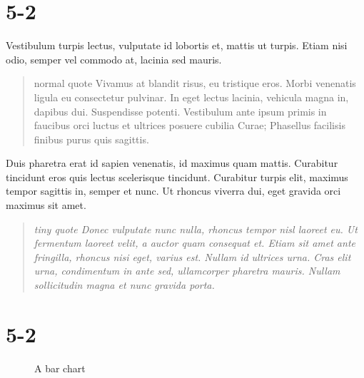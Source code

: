 \documentclass{scrartcl}
\begin{document}
\section{5-2}
\newenvironment{tinyitalicsquote}{\begin{quote}\tiny\itshape}{\end{quote}}


Vestibulum turpis lectus, vulputate id lobortis et, mattis ut turpis. Etiam nisi odio, semper vel commodo at, lacinia sed mauris.

\begin{quote}
 normal quote 
 Vivamus at blandit risus, eu tristique eros. Morbi venenatis ligula eu consectetur pulvinar. In eget lectus lacinia, vehicula magna in, dapibus dui. Suspendisse potenti. Vestibulum ante ipsum primis in faucibus orci luctus et ultrices posuere cubilia Curae; Phasellus facilisis finibus purus quis sagittis.

  
\end{quote}

Duis pharetra erat id sapien venenatis, id maximus quam mattis. Curabitur tincidunt eros quis lectus scelerisque tincidunt. Curabitur turpis elit, maximus tempor sagittis in, semper et nunc. Ut rhoncus viverra dui, eget gravida orci maximus sit amet.
\begin{tinyitalicsquote}
 tiny quote 
  Donec vulputate nunc nulla, rhoncus tempor nisl laoreet eu. Ut fermentum laoreet velit, a auctor quam consequat et. Etiam sit amet ante fringilla, rhoncus nisi eget, varius est. Nullam id ultrices urna. Cras elit urna, condimentum in ante sed, ullamcorper pharetra mauris. Nullam sollicitudin magna et nunc gravida porta. 

\end{tinyitalicsquote}

\section{5-2}
\begin{figure}
\centering 
  \caption{A bar chart}
\end{figure}
\end{document}
